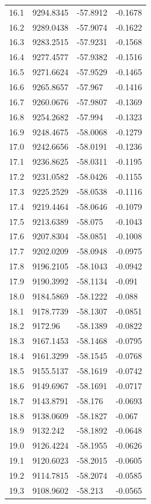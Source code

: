 \begin{table}[H]
\begin{tabular}{llll}
16.1 & 9294.8345 & -57.8912 & -0.1678 \\
16.2 & 9289.0438 & -57.9074 & -0.1622 \\
16.3 & 9283.2515 & -57.9231 & -0.1568 \\
16.4 & 9277.4577 & -57.9382 & -0.1516 \\
16.5 & 9271.6624 & -57.9529 & -0.1465 \\
16.6 & 9265.8657 & -57.967 & -0.1416 \\
16.7 & 9260.0676 & -57.9807 & -0.1369 \\
16.8 & 9254.2682 & -57.994 & -0.1323 \\
16.9 & 9248.4675 & -58.0068 & -0.1279 \\
17.0 & 9242.6656 & -58.0191 & -0.1236 \\
17.1 & 9236.8625 & -58.0311 & -0.1195 \\
17.2 & 9231.0582 & -58.0426 & -0.1155 \\
17.3 & 9225.2529 & -58.0538 & -0.1116 \\
17.4 & 9219.4464 & -58.0646 & -0.1079 \\
17.5 & 9213.6389 & -58.075 & -0.1043 \\
17.6 & 9207.8304 & -58.0851 & -0.1008 \\
17.7 & 9202.0209 & -58.0948 & -0.0975 \\
17.8 & 9196.2105 & -58.1043 & -0.0942 \\
17.9 & 9190.3992 & -58.1134 & -0.091 \\
18.0 & 9184.5869 & -58.1222 & -0.088 \\
18.1 & 9178.7739 & -58.1307 & -0.0851 \\
18.2 & 9172.96 & -58.1389 & -0.0822 \\
18.3 & 9167.1453 & -58.1468 & -0.0795 \\
18.4 & 9161.3299 & -58.1545 & -0.0768 \\
18.5 & 9155.5137 & -58.1619 & -0.0742 \\
18.6 & 9149.6967 & -58.1691 & -0.0717 \\
18.7 & 9143.8791 & -58.176 & -0.0693 \\
18.8 & 9138.0609 & -58.1827 & -0.067 \\
18.9 & 9132.242 & -58.1892 & -0.0648 \\
19.0 & 9126.4224 & -58.1955 & -0.0626 \\
19.1 & 9120.6023 & -58.2015 & -0.0605 \\
19.2 & 9114.7815 & -58.2074 & -0.0585 \\
19.3 & 9108.9602 & -58.213 & -0.0565 \\

\end{tabular}
\end{table}
